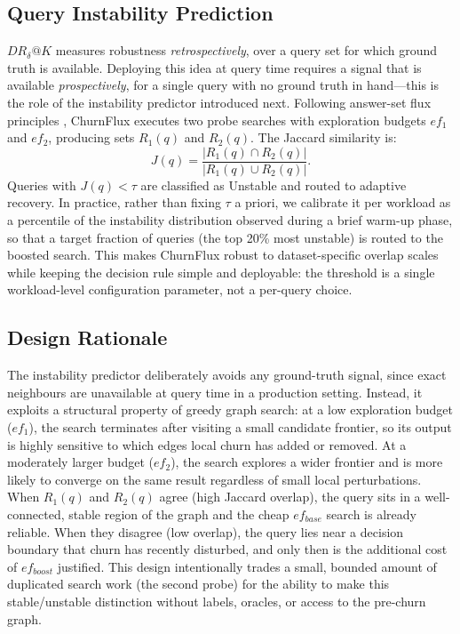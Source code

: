 \documentclass{ieeeaccess}
\begin{document}
\subsection{Query Instability Prediction}
$DR_{\delta}@K$ measures robustness \emph{retrospectively}, over a query set for which ground truth is available. Deploying this idea at query time requires a signal that is available \emph{prospectively}, for a single query with no ground truth in hand---this is the role of the instability predictor introduced next. Following answer-set flux principles \cite{Sheaf2026}, ChurnFlux executes two probe searches with exploration budgets $ef_1$ and $ef_2$, producing sets $R_1(q)$ and $R_2(q)$. The Jaccard similarity is:
\begin{equation}
J(q)= \frac{|R_1(q)\cap R_2(q)|}{|R_1(q)\cup R_2(q)|}.
\label{eq:jaccard}
\end{equation}
Queries with $J(q) < \tau$ are classified as Unstable and routed to adaptive recovery. In practice, rather than fixing $\tau$ a priori, we calibrate it per workload as a percentile of the instability distribution observed during a brief warm-up phase, so that a target fraction of queries (the top 20\% most unstable) is routed to the boosted search. This makes ChurnFlux robust to dataset-specific overlap scales while keeping the decision rule simple and deployable: the threshold is a single workload-level configuration parameter, not a per-query choice.

\subsection{Design Rationale}
The instability predictor deliberately avoids any ground-truth signal, since exact neighbours are unavailable at query time in a production setting. Instead, it exploits a structural property of greedy graph search: at a low exploration budget ($ef_1$), the search terminates after visiting a small candidate frontier, so its output is highly sensitive to which edges local churn has added or removed. At a moderately larger budget ($ef_2$), the search explores a wider frontier and is more likely to converge on the same result regardless of small local perturbations. When $R_1(q)$ and $R_2(q)$ agree (high Jaccard overlap), the query sits in a well-connected, stable region of the graph and the cheap $ef_{base}$ search is already reliable. When they disagree (low overlap), the query lies near a decision boundary that churn has recently disturbed, and only then is the additional cost of $ef_{boost}$ justified. This design intentionally trades a small, bounded amount of duplicated search work (the second probe) for the ability to make this stable/unstable distinction without labels, oracles, or access to the pre-churn graph.
\end{document}
